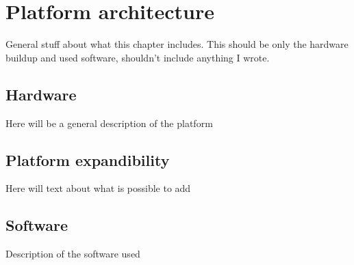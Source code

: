 \chapter{Platform architecture}\label{cha:PlatformArchitecture}

General stuff about what this chapter includes. This should be only the hardware buildup and used software, shouldn't include anything I wrote.

\section{Hardware}
\pagestyle{scrheadings}

Here will be a general description of the platform

\section{Platform expandibility}
\pagestyle{scrheadings}

Here will text about what is possible to add

\section{Software}
\pagestyle{scrheadings}

Description of the software used

